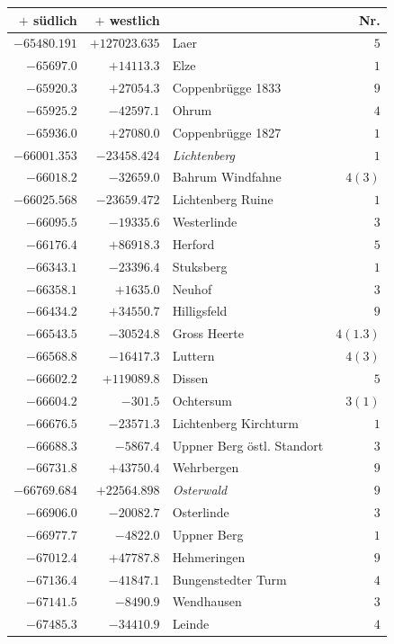 \clearpage
\begin{center}\begingroup\fontsize{8}{9}\selectfont
\setlength{\tabcolsep}{4pt}
\begin{tabular}{r|r|p{170pt}|r}\hline
\(+\) südlich&\(+\) westlich&&Nr.\\\hline
\(-65480.191\)&\(+127023.635\)&Laer&\(5\)\\
\(-65697.0\)&\(+14113.3\)&Elze&\(1\)\\
\(-65920.3\)&\(+27054.3\)&Coppenbrügge 1833&\(9\)\\
\(-65925.2\)&\(-42597.1\)&Ohrum&\(4\)\\
\(-65936.0\)&\(+27080.0\)&Coppenbrügge 1827&\(1\)\\
\(-66001.353\)&\(-23458.424\)&\textit{Lichtenberg}&\(1\)\\
\(-66018.2\)&\(-32659.0\)&Bahrum Windfahne&\(4 (3)\)\\
\(-66025.568\)&\(-23659.472\)&Lichtenberg Ruine&\(1\)\\
\(-66095.5\)&\(-19335.6\)&Westerlinde&\(3\)\\
\(-66176.4\)&\(+86918.3\)&Herford&\(5\)\\
\(-66343.1\)&\(-23396.4\)&Stuksberg&\(1\)\\
\(-66358.1\)&\(+1635.0\)&Neuhof&\(3\)\\
\(-66434.2\)&\(+34550.7\)&Hilligsfeld&\(9\)\\
\(-66543.5\)&\(-30524.8\)&Gross Heerte&\(4(1.3)\)\\
\(-66568.8\)&\(-16417.3\)&Luttern&\(4 (3)\)\\
\(-66602.2\)&\(+119089.8\)&Dissen&\(5\)\\
\(-66604.2\)&\(-301.5\)&Ochtersum&\(3 (1)\)\\
\(-66676.5\)&\(-23571.3\)&Lichtenberg Kirchturm&\(1\)\\
\(-66688.3\)&\(-5867.4\)&Uppner Berg östl. Standort&\(3\)\\
\(-66731.8\)&\(+43750.4\)&Wehrbergen&\(9\)\\
\(-66769.684\)&\(+22564.898\)&\textit{Osterwald}&\(9\)\\
\(-66906.0\)&\(-20082.7\)&Osterlinde&\(3\)\\
\(-66977.7\)&\(-4822.0\)&Uppner Berg&\(1\)\\
\(-67012.4\)&\(+47787.8\)&Hehmeringen&\(9\)\\
\(-67136.4\)&\(-41847.1\)&Bungenstedter Turm&\(4\)\\
\(-67141.5\)&\(-8490.9\)&Wendhausen&\(3\)\\
\(-67485.3\)&\(-34410.9\)&Leinde&\(4\)\\

\end{tabular}
\end{center}
